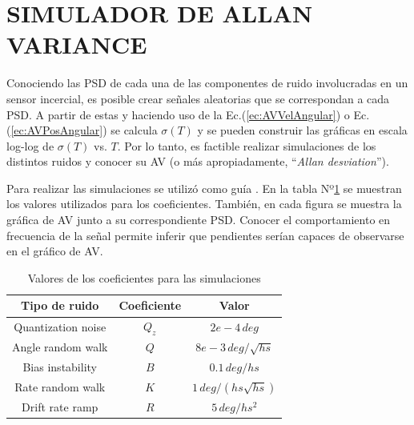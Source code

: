 \documentclass[a4paper,11pt,twoside]{IT-CNEA}
\begin{document}
\section{SIMULADOR DE ALLAN VARIANCE}
Conociendo las PSD de cada una de las componentes de ruido involucradas en un sensor incercial, es posible crear señales aleatorias que se correspondan a cada PSD. A partir de estas y haciendo uso de la Ec.(\ref{ec:AVVelAngular}) o Ec.(\ref{ec:AVPosAngular}) se calcula $\sigma(T)$ y se pueden construir las gráficas en escala log-log de $\sigma(T)$ vs. $T$. Por lo tanto, es factible realizar simulaciones de los distintos ruidos y conocer su AV (o más apropiadamente, ``\textit{Allan desviation}'').
\par Para realizar las simulaciones se utilizó como guía \cite{JuanJurado}. En la tabla Nº\ref{tabla:valoresCoeficientes} se muestran los valores utilizados para los coeficientes. También, en cada figura se muestra la gráfica de AV junto a su correspondiente PSD. Conocer el comportamiento en frecuencia de la señal permite inferir que pendientes serían capaces de observarse en el gráfico de AV. 
\begin{table}[h!]
\centering
\caption{Valores de los coeficientes para las simulaciones}
\label{tabla:valoresCoeficientes}
\begin{tabular}{|c|c|c|}
\hline
Tipo de ruido&Coeficiente& Valor \\ \hline
Quantization noise&$Q_z$&$2e-4\,deg$ \\ \hline
Angle random walk&$Q$&$8e-3\,deg/\sqrt{hs}$ \\ \hline
Bias instability&$B$&$0.1\,deg/hs$ \\ \hline
Rate random walk&$K$&$1\,deg/\left( hs\sqrt{hs}\right)$ \\ \hline
Drift rate ramp&$R$&$5\,deg/hs^2$ \\ \hline
\end{tabular}
\end{table}
\end{document}
